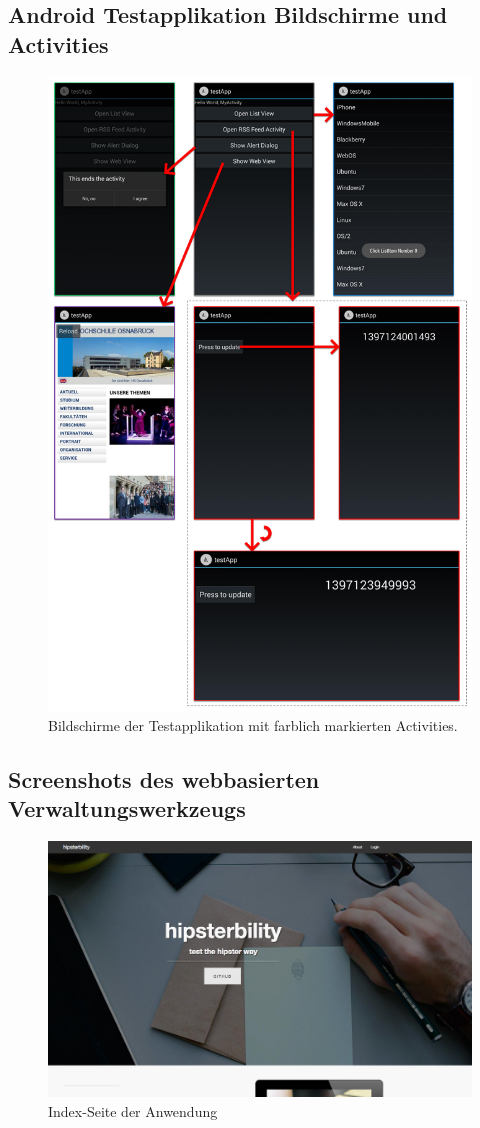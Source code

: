 \subsection{Android Testapplikation Bildschirme und Activities \label{anhang:test_app_screens}}
\begin{figure}[htb]
	\centering
	\includegraphics[width=0.7\linewidth]{img/client_test_app_screens}
	\caption{Bildschirme der Testapplikation mit farblich markierten Activities. \label{fig:client_test_app_screens}}
\end{figure}

\newpage

\subsection{Screenshots des webbasierten Verwaltungswerkzeugs}
\label{anhang:screens-webtool}

\begin{figure}[h!]
	\centering
		\includegraphics[width=\linewidth,keepaspectratio]{img/index-page.png}
	\caption{Index-Seite der Anwendung}
	\label{fig: index-page}
\end{figure}


